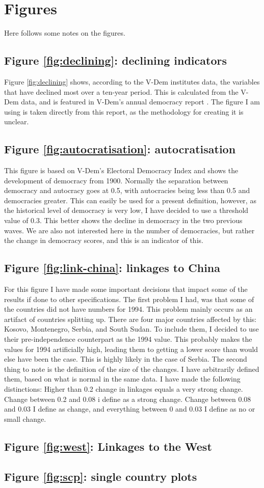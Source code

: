 \section{Figures}
Here follows some notes on the figures.

\subsection{Figure \ref{fig:declining}: declining indicators}
Figure \ref{fig:declining} shows, according to the V-Dem institutes data, the variables that have declined most over a ten-year period. This is calculated from the V-Dem data, and is featured in V-Dem's annual democracy report \citep[p. 17]{nord_democracy_2025}. The figure I am using is taken directly from this report, as the methodology for creating it is unclear.

\subsection{Figure \ref{fig:autocratisation}: autocratisation}
This figure is based on V-Dem's Electoral Democracy Index and shows the development of democracy from 1900. Normally the separation between democracy and autocracy goes at 0.5, with autocracies being less than 0.5 and democracies greater. This can easily be used for a present definition, however, as the historical level of democracy is very low, I have decided to use a threshold value of 0.3. This better shows the decline in democracy in the two previous waves. We are also not interested here in the number of democracies, but rather the change in democracy scores, and this is an indicator of this.

\subsection{Figure \ref{fig:link-china}: linkages to China}
For this figure I have made some important decisions that impact some of the results if done to other specifications. The first problem I had, was that some of the countries did not have numbers for 1994. This problem mainly occurs as an artifact of countries splitting up. There are four major countries affected by this: Kosovo, Montenegro, Serbia, and South Sudan. To include them, I decided to use their pre-independence counterpart as the 1994 value. This probably makes the values for 1994 artificially high, leading them to getting a lower score than would else have been the case. This is highly likely in the case of Serbia. The second thing to note is the definition of the size of the changes. I have arbitrarily defined them, based on what is normal in the same data. I have made the following distinctions: Higher than 0.2 change in linkages equals a very strong change. Change between 0.2 and 0.08 i define as a strong change. Change between 0.08 and 0.03 I define as change, and everything between 0 and 0.03 I define as no or small change. 

\subsection{Figure \ref{fig:west}: Linkages to the West}

\subsection{Figure \ref{fig:scp}: single country plots}